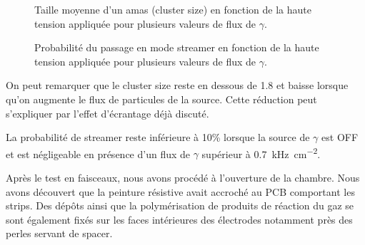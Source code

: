 \begin{figure}
	\centering
	\scalebox{1.3}{}
	\caption{Taille moyenne d'un amas (cluster size) en fonction de la haute tension appliquée pour plusieurs valeurs de flux de $\gamma$.}
	\label{clustersize}
\end{figure}
\begin{figure}
	\centering
	\scalebox{1.3}{}
	\caption{Probabilité du passage en mode streamer en fonction de la haute tension appliquée pour plusieurs valeurs de flux de $\gamma$.}
	\label{probastreamer}
\end{figure}

On peut remarquer que le cluster size reste en dessous de \num{1.8} et baisse lorsque qu'on augmente le flux de particules de la source. Cette réduction peut s'expliquer par l'effet d'écrantage déjà discuté.

La probabilité de streamer reste inférieure à 10\% lorsque la source de $\gamma$ est OFF et est négligeable en présence d'un flux de $\gamma$ supérieur à \SI{0.7}{\kilo\hertz\per\square\centi\meter}.

Après le test en faisceaux, nous avons procédé à l'ouverture de la chambre. Nous avons découvert que la peinture résistive avait accroché au PCB comportant les strips. Des dépôts ainsi que la polymérisation de produits de réaction du gaz se sont également fixés sur les faces intérieures des électrodes notamment près des perles servant de spacer. 


